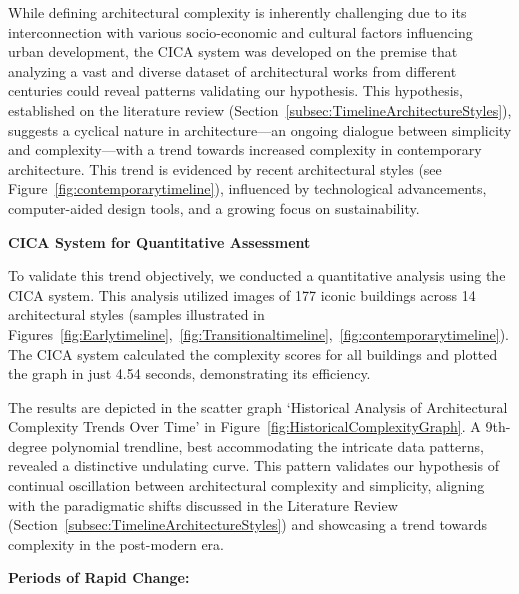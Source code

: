 %    


While defining architectural complexity is inherently challenging due to its interconnection with various socio-economic and cultural factors influencing urban development, the CICA system was developed on the premise that analyzing a vast and diverse dataset of architectural works from different centuries could reveal patterns validating our hypothesis.
This hypothesis, established on the literature review (Section~\ref{subsec:TimelineArchitectureStyles}), suggests a cyclical nature in architecture—an ongoing dialogue between simplicity and complexity—with a trend towards increased complexity in contemporary architecture.
This trend is evidenced by recent architectural styles (see Figure~\ref{fig:contemporarytimeline}), influenced by technological advancements, computer-aided design tools, and a growing focus on sustainability.

\textbf{CICA System for Quantitative Assessment}

To validate this trend objectively, we conducted a quantitative analysis using the CICA system.
This analysis utilized images of 177 iconic buildings across 14 architectural styles (samples illustrated in Figures~\ref{fig:Earlytimeline},~\ref{fig:Transitionaltimeline},~\ref{fig:contemporarytimeline}). The CICA system calculated the complexity scores for all buildings and plotted the graph in just 4.54 seconds, demonstrating its efficiency.

The results are depicted in the scatter graph `Historical Analysis of Architectural Complexity Trends Over Time' in Figure~\ref{fig:HistoricalComplexityGraph}.
A 9th-degree polynomial trendline, best accommodating the intricate data patterns, revealed a distinctive undulating curve.
This pattern validates our hypothesis of continual oscillation between architectural complexity and simplicity, aligning with the paradigmatic shifts discussed in the Literature Review (Section~\ref{subsec:TimelineArchitectureStyles}) and showcasing a trend towards complexity in the post-modern era.

\textbf{Periods of Rapid Change:}


